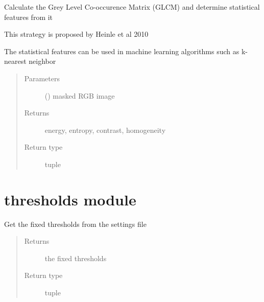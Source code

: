 \documentclass[letterpaper,10pt,english]{sphinxmanual}
\begin{document}
\begin{fulllineitems}
\label{\detokenize{statistical_analysis:statistical_analysis.work}}
Calculate the Grey Level Co-occurence Matrix (GLCM) and determine statistical features from it

This strategy is proposed by Heinle et al 2010

The statistical features can be used in machine learning algorithms such as k-nearest neighbor
\begin{quote}\begin{description}
\item[{Parameters}] \leavevmode
{} () \textendash{} masked RGB image

\item[{Returns}] \leavevmode
energy, entropy, contrast, homogeneity

\item[{Return type}] \leavevmode
tuple

\end{description}\end{quote}

\end{fulllineitems}



\section{thresholds module}
\label{\detokenize{thresholds:thresholds-module}}\label{\detokenize{thresholds:module-thresholds}}\label{\detokenize{thresholds::doc}}

\begin{fulllineitems}
\label{\detokenize{thresholds:thresholds.fixed}}
Get the fixed thresholds from the settings file
\begin{quote}\begin{description}
\item[{Returns}] \leavevmode
the fixed thresholds

\item[{Return type}] \leavevmode
tuple

\end{description}\end{quote}

\end{fulllineitems}
\end{document}
